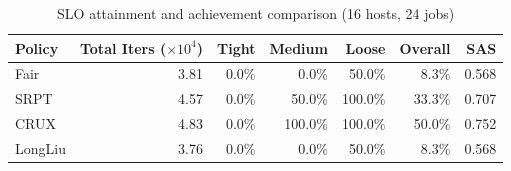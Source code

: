 \begin{table}[t]
\centering
\caption{SLO attainment and achievement comparison (16 hosts, 24 jobs)}
\label{tab:slo_16host}
\begin{tabular}{l|r|r|r|r|r|r}
\hline
Policy & Total Iters ($\times 10^4$) & Tight & Medium & Loose & Overall & SAS \\
\hline
Fair & 3.81 & 0.0\% & 0.0\% & 50.0\% & 8.3\% & 0.568 \\
SRPT & 4.57 & 0.0\% & 50.0\% & 100.0\% & 33.3\% & 0.707 \\
CRUX & 4.83 & 0.0\% & 100.0\% & 100.0\% & 50.0\% & 0.752 \\
LongLiu & 3.76 & 0.0\% & 0.0\% & 50.0\% & 8.3\% & 0.568 \\
\hline
\end{tabular}
\end{table}
